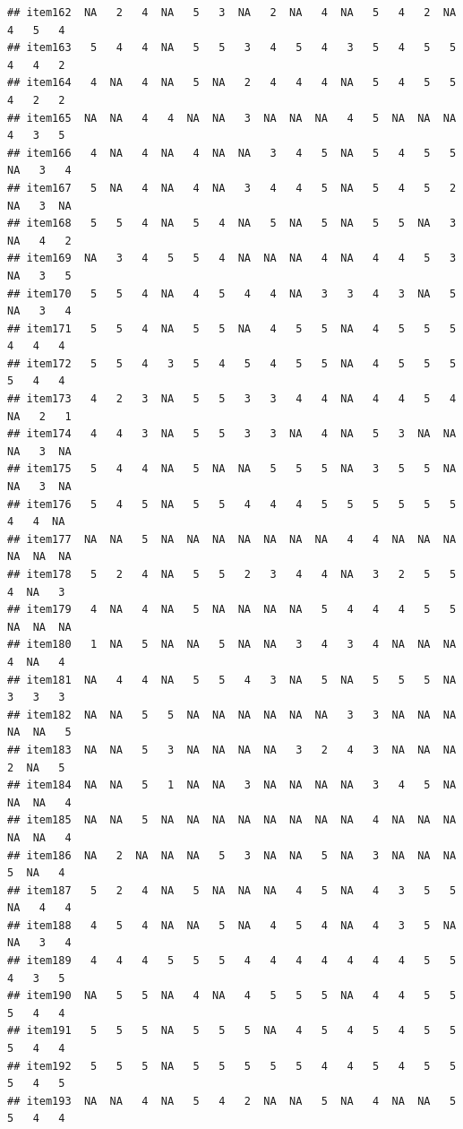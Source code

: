 \documentclass[
  man]{apa6}
\begin{document}
\begin{verbatim}
## item162  NA   2   4  NA   5   3  NA   2  NA   4  NA   5   4   2  NA   4   5   4
## item163   5   4   4  NA   5   5   3   4   5   4   3   5   4   5   5   4   4   2
## item164   4  NA   4  NA   5  NA   2   4   4   4  NA   5   4   5   5   4   2   2
## item165  NA  NA   4   4  NA  NA   3  NA  NA  NA   4   5  NA  NA  NA   4   3   5
## item166   4  NA   4  NA   4  NA  NA   3   4   5  NA   5   4   5   5  NA   3   4
## item167   5  NA   4  NA   4  NA   3   4   4   5  NA   5   4   5   2  NA   3  NA
## item168   5   5   4  NA   5   4  NA   5  NA   5  NA   5   5  NA   3  NA   4   2
## item169  NA   3   4   5   5   4  NA  NA  NA   4  NA   4   4   5   3  NA   3   5
## item170   5   5   4  NA   4   5   4   4  NA   3   3   4   3  NA   5  NA   3   4
## item171   5   5   4  NA   5   5  NA   4   5   5  NA   4   5   5   5   4   4   4
## item172   5   5   4   3   5   4   5   4   5   5  NA   4   5   5   5   5   4   4
## item173   4   2   3  NA   5   5   3   3   4   4  NA   4   4   5   4  NA   2   1
## item174   4   4   3  NA   5   5   3   3  NA   4  NA   5   3  NA  NA  NA   3  NA
## item175   5   4   4  NA   5  NA  NA   5   5   5  NA   3   5   5  NA  NA   3  NA
## item176   5   4   5  NA   5   5   4   4   4   5   5   5   5   5   5   4   4  NA
## item177  NA  NA   5  NA  NA  NA  NA  NA  NA  NA   4   4  NA  NA  NA  NA  NA  NA
## item178   5   2   4  NA   5   5   2   3   4   4  NA   3   2   5   5   4  NA   3
## item179   4  NA   4  NA   5  NA  NA  NA  NA   5   4   4   4   5   5  NA  NA  NA
## item180   1  NA   5  NA  NA   5  NA  NA   3   4   3   4  NA  NA  NA   4  NA   4
## item181  NA   4   4  NA   5   5   4   3  NA   5  NA   5   5   5  NA   3   3   3
## item182  NA  NA   5   5  NA  NA  NA  NA  NA  NA   3   3  NA  NA  NA  NA  NA   5
## item183  NA  NA   5   3  NA  NA  NA  NA   3   2   4   3  NA  NA  NA   2  NA   5
## item184  NA  NA   5   1  NA  NA   3  NA  NA  NA  NA   3   4   5  NA  NA  NA   4
## item185  NA  NA   5  NA  NA  NA  NA  NA  NA  NA  NA   4  NA  NA  NA  NA  NA   4
## item186  NA   2  NA  NA  NA   5   3  NA  NA   5  NA   3  NA  NA  NA   5  NA   4
## item187   5   2   4  NA   5  NA  NA  NA   4   5  NA   4   3   5   5  NA   4   4
## item188   4   5   4  NA  NA   5  NA   4   5   4  NA   4   3   5  NA  NA   3   4
## item189   4   4   4   5   5   5   4   4   4   4   4   4   4   5   5   4   3   5
## item190  NA   5   5  NA   4  NA   4   5   5   5  NA   4   4   5   5   5   4   4
## item191   5   5   5  NA   5   5   5  NA   4   5   4   5   4   5   5   5   4   4
## item192   5   5   5  NA   5   5   5   5   5   4   4   5   4   5   5   5   4   5
## item193  NA  NA   4  NA   5   4   2  NA  NA   5  NA   4  NA  NA   5   5   4   4

\end{verbatim}
\end{document}
